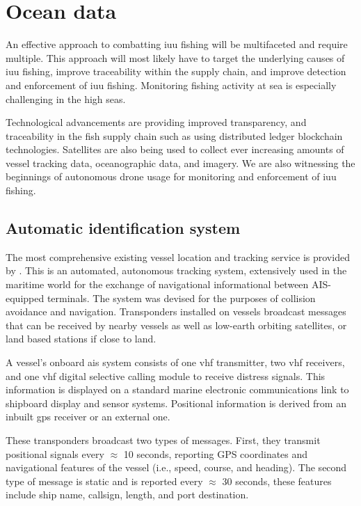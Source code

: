 \section{Ocean data}
An effective approach to combatting \gls{iuu} fishing will be multifaceted and require multiple. This approach will most likely have to target the underlying causes of \gls{iuu} fishing, improve traceability within the supply chain, and improve detection and enforcement of \gls{iuu} fishing. Monitoring fishing activity at sea is especially challenging in the high seas.

Technological advancements are providing improved transparency, and traceability in the fish supply chain such as using distributed ledger blockchain technologies. Satellites are also being used to collect ever increasing amounts of vessel tracking data, oceanographic data, and imagery. We are also witnessing the beginnings of autonomous drone usage for monitoring and enforcement of \gls{iuu} fishing.

\subsection{Automatic identification system}
The most comprehensive existing vessel location and tracking service is provided by . This is an automated, autonomous tracking system, extensively used in the maritime world for the exchange of navigational informational between AIS-equipped terminals. The system was devised for the purposes of collision avoidance and navigation. Transponders installed on vessels broadcast messages that can be received by nearby vessels as well as low-earth orbiting satellites, or land based stations if close to land. 

A vessel's onboard \gls{ais} system consists of one \gls{vhf} transmitter, two \gls{vhf} receivers, and one \gls{vhf} digital selective calling module to receive distress signals. This information is displayed on a standard marine electronic communications link to shipboard display and sensor systems. Positional information is derived from an inbuilt \gls{gps} receiver or an external one. 

These transponders broadcast two types of messages. First, they transmit positional signals every $\approx$ 10 seconds, reporting GPS coordinates and navigational features of the vessel (i.e., speed, course, and heading). The second type of message is static and is reported every $\approx$ 30 seconds, these features include ship name, callsign, length, and port destination. 

